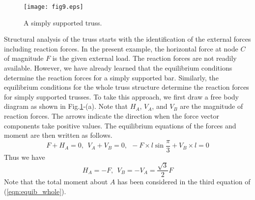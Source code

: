 ﻿\documentclass[10pt,a4j]{article}
\begin{document}
\begin{figure}[h]
	\begin{center}
	\texttt{[image: fig9.eps]} 
	\end{center}
	\caption{A simply supported truss.} 
	\label{fig:fig9}
\end{figure}
Structural analysis of the truss starts with the identification of the external forces including reaction forces. 
In the present example, the horizontal force at node $C$ of magnitude $F$ is the given external load. 
The reaction forces are not readily available. However, we have already learned that the equilibrium conditions determine the reaction forces for a simply supported bar. 
Similarly, the equilibrium conditions for the whole truss structure determine the reaction forces for simply supported trusses. 
To take this approach, we first draw a free body diagram as shown in Fig.\ref{fig:fig9}-(a). 
Note that $H_A$, $V_A$, and $V_B$ are the magnitude of reaction forces. 
The arrows indicate the direction when the force vector components take positive values. 
The equilibrium equations of the forces and moment are then written as follows.
\begin{equation}
	F+H_A=0, \ \ V_A+V_B=0, \ \ -F\times l\sin\frac{\pi}{3}+V_B\times l=0 
	\label{eqn:equib_whole}
\end{equation}
Thus we have 
\begin{equation}
	H_A=-F, \ \ V_B=-V_A=\frac{\sqrt{3}}{2}F
	\label{eqn:reac_frc}
\end{equation}
Note that the total moment about $A$ has been considered in the third equation of (\ref{eqn:equib_whole}).
\end{document}
